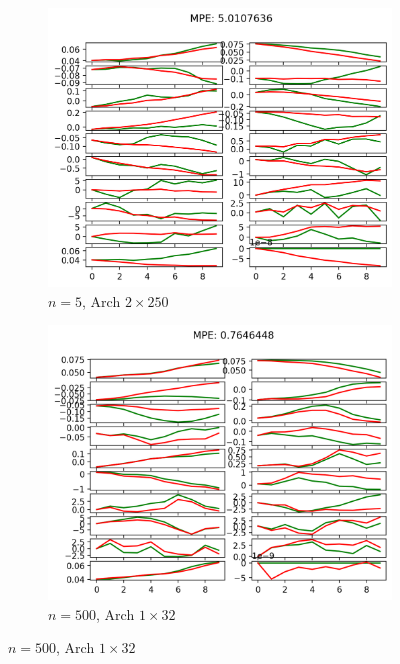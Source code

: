 \begin{figure}[htbp]
    \begin{subfigure}[b]{0.3\linewidth}
        \centering
        \includegraphics[width=1.0\linewidth]{figures/p1-n5_2_250.png}
        \caption{$n = 5$, Arch $2\times 250$}
    \end{subfigure}
    \begin{subfigure}[b]{0.3\linewidth}
        \centering
        \includegraphics[width=1.0\linewidth]{figures/p1-n500_1_32.png}
        \caption{$n = 500$, Arch $1\times 32$}
    \end{subfigure}

\end{figure}
